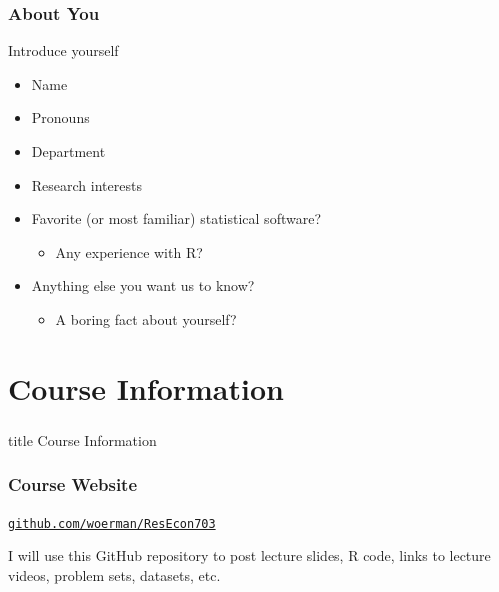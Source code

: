 \documentclass{beamer}
\begin{document}
\begin{frame}\frametitle{About You}
    Introduce yourself
    \begin{itemize}
        \item Name
        \item Pronouns
        \item Department
        \item Research interests
        \item Favorite (or most familiar) statistical software? 
        \begin{itemize}
            \item Any experience with R?
        \end{itemize}
        \item Anything else you want us to know?
        \begin{itemize}
            \item A boring fact about yourself?
        \end{itemize}
    \end{itemize}
\end{frame}

\section{Course Information}
\label{information}
\begin{frame}\frametitle{}
    \vfill
    \centering
    \begin{beamercolorbox}[center]{title}
        \Large Course Information
    \end{beamercolorbox}
    \vfill
\end{frame}

\begin{frame}\frametitle{Course Website}
    \begin{center}
    	\href{https://github.com/woerman/ResEcon703}{\texttt{github.com/woerman/ResEcon703}}
    \end{center}
    \vspace{3ex}
    I will use this GitHub repository to post lecture slides, R code, links to lecture videos, problem sets, datasets, etc.
\end{frame}
\end{document}
